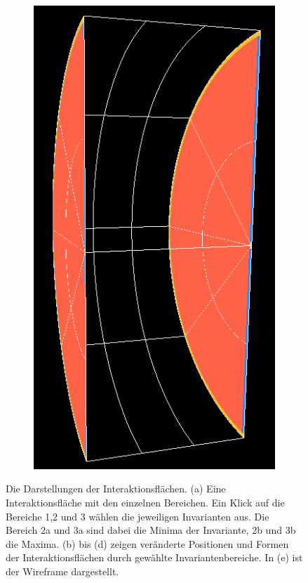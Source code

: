\documentclass[a4paper,fontsize=12pt,toc=bib,halfparskip]{scrartcl}
\begin{document}
\begin{figure}
\begin{subfigure}{0.15\textwidth}
		\includegraphics[width=\textwidth]{pictures/InteractionPlanes5.png}
		\subcaption{}
		\label{InteractionPlaneE}
	\end{subfigure}
	\hspace*{\fill}
	\caption{Die Darstellungen der Interaktionsfl\"achen. (a) Eine Interaktionsfl\"ache mit den einzelnen Bereichen. Ein Klick auf die Bereiche 1,2 und 3 w\"ahlen die jeweiligen Invarianten aus. Die Bereich 2a und 3a sind dabei die Minima der Invariante, 2b und 3b die Maxima. (b) bis (d) zeigen ver\"anderte Positionen und Formen der Interaktionsfl\"achen durch gew\"ahlte Invariantenbereiche. In (e) ist der Wireframe dargestellt.}
\end{figure}
\end{document}
